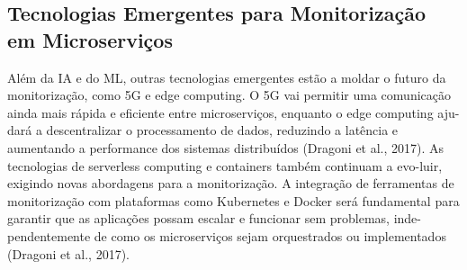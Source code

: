 \subsection{Tecnologias Emergentes para Monitorização em Microserviços}

Além da IA e do ML, outras tecnologias emergentes estão a moldar o futuro da monitorização, como 5G e edge computing. O 5G vai permitir uma comunicação ainda mais rápida e eficiente entre microserviços, enquanto o edge computing aju-dará a descentralizar o processamento de dados, reduzindo a latência e aumentando a performance dos sistemas distribuídos (Dragoni et al., 2017).
As tecnologias de serverless computing e containers também continuam a evo-luir, exigindo novas abordagens para a monitorização. A integração de ferramentas de monitorização com plataformas como Kubernetes e Docker será fundamental para garantir que as aplicações possam escalar e funcionar sem problemas, inde-pendentemente de como os microserviços sejam orquestrados ou implementados (Dragoni et al., 2017).
